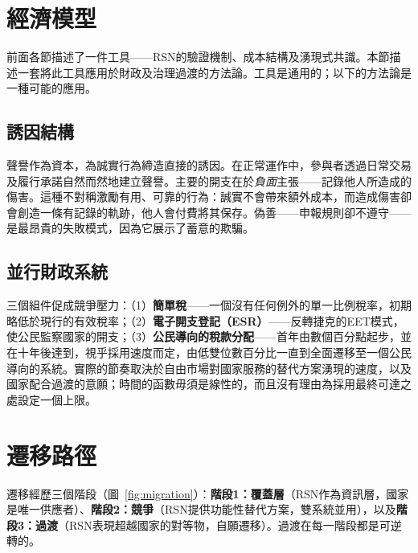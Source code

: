 \documentclass[11pt,a4paper,twocolumn]{article}
\begin{document}
\section{經濟模型}

前面各節描述了一件工具——RSN的驗證機制、成本結構及湧現式共識。本節描述一套將此工具應用於財政及治理過渡的方法論。工具是通用的；以下的方法論是一種可能的應用。

\subsection{誘因結構}

聲譽作為資本，為誠實行為締造直接的誘因。在正常運作中，參與者透過日常交易及履行承諾自然而然地建立聲譽。主要的開支在於\emph{負面}主張——記錄他人所造成的傷害。這種不對稱激勵有用、可靠的行為：誠實不會帶來額外成本，而造成傷害卻會創造一條有記錄的軌跡，他人會付費將其保存。偽善——申報規則卻不遵守——是最昂貴的失敗模式，因為它展示了蓄意的欺騙。

\subsection{並行財政系統}

三個組件促成競爭壓力：（1）\textbf{簡單稅}——一個沒有任何例外的單一比例稅率，初期略低於現行的有效稅率；（2）\textbf{電子開支登記（ESR）}——反轉捷克的EET模式，使公民監察國家的開支；（3）\textbf{公民導向的稅款分配}——首年由數個百分點起步，並在十年後達到，視乎採用速度而定，由低雙位數百分比一直到全面遷移至一個公民導向的系統。實際的節奏取決於自由市場對國家服務的替代方案湧現的速度，以及國家配合過渡的意願；時間的函數毋須是線性的，而且沒有理由為採用最終可達之處設定一個上限。

\section{遷移路徑}

遷移經歷三個階段（圖~\ref{fig:migration}）：\textbf{階段1：覆蓋層}（RSN作為資訊層，國家是唯一供應者）、\textbf{階段2：競爭}（RSN提供功能性替代方案，雙系統並用），以及\textbf{階段3：過渡}（RSN表現超越國家的對等物，自願遷移）。過渡在每一階段都是可逆轉的。
\end{document}
